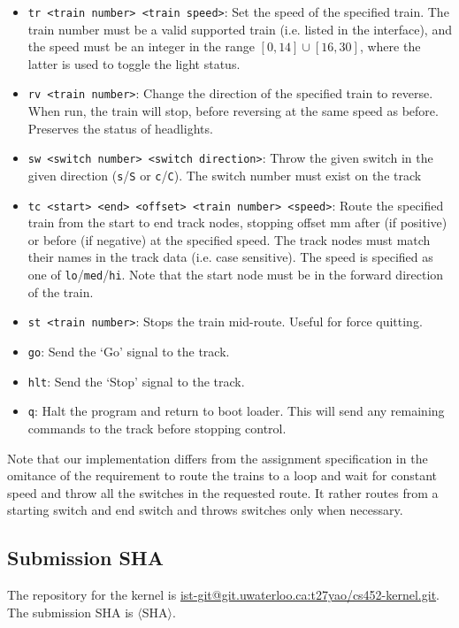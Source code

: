 \documentclass[12pt, titlepage]{article}
\begin{document}
    \begin{itemize}
        \item \verb`tr <train number> <train speed>`: Set the speed of the specified train. The train number must be a valid supported train (i.e. listed in the interface), and the speed must be an integer in the range $[0,14] \cup [16,30]$, where the latter is used to toggle the light status.
        \item \verb`rv <train number>`: Change the direction of the specified train to reverse. When run, the train will stop, before reversing at the same speed as before. Preserves the status of headlights.
        \item \verb`sw <switch number> <switch direction>`: Throw the given switch in the given direction (\verb`s`/\verb`S` or \verb`c`/\verb`C`). The switch number must exist on the track
        \item \verb`tc <start> <end> <offset> <train number> <speed>`: Route the specified train from the start to end track nodes, stopping offset mm after (if positive) or before (if negative) at the specified speed. The track nodes must match their names in the track data (i.e. case sensitive). The speed is specified as one of \verb`lo`/\verb`med`/\verb`hi`. Note that the start node must be in the forward direction of the train.
        \item \verb`st <train number>`: Stops the train mid-route. Useful for force quitting.
        \item \verb`go`: Send the `Go' signal to the track.
        \item \verb`hlt`: Send the `Stop' signal to the track.
        \item \verb`q`: Halt the program and return to boot loader. This will send any remaining commands to the track before stopping control.
    \end{itemize}

    Note that our implementation differs from the assignment specification in the omitance of the requirement to route the trains to a loop and wait for constant speed and throw all the switches in the requested route. It rather routes from a starting switch and end switch and throws switches only when necessary.

    \subsection{Submission SHA}

    The repository for the kernel is \href{https://git.uwaterloo.ca/t27yao/cs452-kernel}{ist-git@git.uwaterloo.ca:t27yao/cs452-kernel.git}. The submission SHA is $\langle$SHA$\rangle$.
\end{document}
